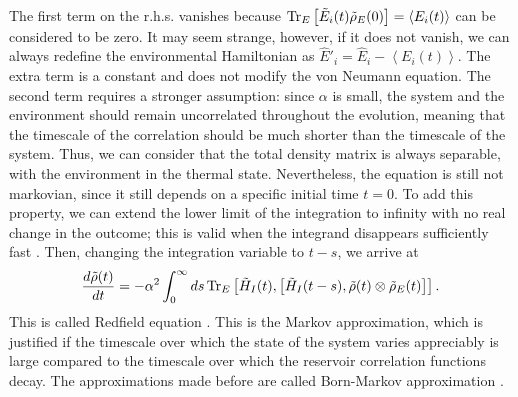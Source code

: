 The first term on the r.h.s. vanishes because $ \operatorname{Tr}_E\left[\tilde E_i(t)\tilde\rho_E(0)\right] = \left<E_i(t)\right>$ can be considered to be zero. 
It may seem strange, however, if it does not vanish, we can always redefine the environmental Hamiltonian as $\hat E'_i = \hat E_i - \left<E_i(t)\right>$. The extra term is a constant and does not modify the von Neumann equation.
The second term requires a stronger assumption: since $\alpha$ is small, the system and the environment should remain uncorrelated throughout the evolution, meaning that the timescale of the correlation should be much shorter than the timescale of the system. Thus, we can consider that the total density matrix is always separable, with the environment in the thermal state.
Nevertheless, the equation is still not markovian, since it still depends on a specific initial time $t= 0$. To add this property, we can extend the lower limit of the integration to infinity with no real change in the outcome; this is valid when the integrand disappears sufficiently fast \cite{Breuer-Petruccione}. Then, changing the integration variable to $t - s$, we arrive at 
\begin{eqnarray}\label{C_markovian}
    \frac{d\tilde \rho(t)}{dt} = -\alpha^2 \int_0^\infty ds \operatorname{Tr}_E\left[\tilde H_I(t),\left[\tilde H_I(t-s),\tilde\rho(t)\otimes\tilde\rho_E(t)\right]\right].
\end{eqnarray}
This is called Redfield equation \cite{Redfield}.
This is the Markov approximation, which is justified if the timescale over which the state of the system varies appreciably is large compared to the timescale over which the reservoir correlation functions decay. The approximations made before are called Born-Markov approximation \cite{Breuer-Petruccione}.


